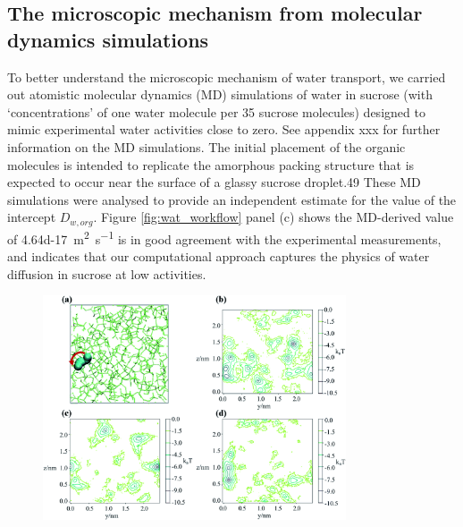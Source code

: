 \subsection{The microscopic mechanism from molecular dynamics simulations}

To better understand the microscopic mechanism of water transport, we carried out atomistic molecular dynamics (MD) simulations of water in sucrose (with ‘concentrations’ of one water molecule per \num{35} sucrose molecules) designed to mimic experimental water activities close to zero. See appendix xxx for further information on the MD simulations. The initial placement of the organic molecules is intended to replicate the amorphous packing structure that is expected to occur near the surface of a glassy sucrose droplet.49 These MD simulations were analysed to provide an independent estimate for the value of the intercept $D_{w,org}$. Figure \ref{fig:wat_workflow} panel (c) shows the MD-derived value of \SI{4.64d-17}{\meter\squared\per\second} is in good agreement with the experimental measurements, and indicates that our computational approach captures the physics of water diffusion in sucrose at low activities.

\begin{figure}
    \centering
    \includegraphics[width=0.8\textwidth]{chapters/water_hopping/figures/f3.png}
    \label{fig:wat_sucrose_matrix}
\end{figure}

